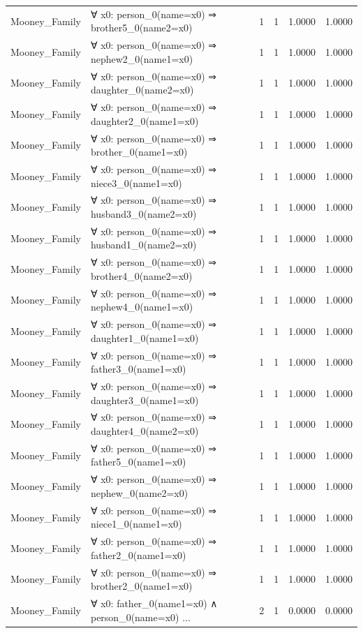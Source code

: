 \documentclass[11pt,a4paper]{article}
\begin{document}
\begin{table}[h!]
\begin{longtable}{|l|p{6cm}|c|c|c|c|}
Mooney_Family & ∀ x0: person\_0(name=x0) ⇒ brother5\_0(name2=x0) & 1 & 1 & 1.0000 & 1.0000 \\
Mooney_Family & ∀ x0: person\_0(name=x0) ⇒ nephew2\_0(name1=x0) & 1 & 1 & 1.0000 & 1.0000 \\
Mooney_Family & ∀ x0: person\_0(name=x0) ⇒ daughter\_0(name2=x0) & 1 & 1 & 1.0000 & 1.0000 \\
Mooney_Family & ∀ x0: person\_0(name=x0) ⇒ daughter2\_0(name1=x0) & 1 & 1 & 1.0000 & 1.0000 \\
Mooney_Family & ∀ x0: person\_0(name=x0) ⇒ brother\_0(name1=x0) & 1 & 1 & 1.0000 & 1.0000 \\
Mooney_Family & ∀ x0: person\_0(name=x0) ⇒ niece3\_0(name1=x0) & 1 & 1 & 1.0000 & 1.0000 \\
Mooney_Family & ∀ x0: person\_0(name=x0) ⇒ husband3\_0(name2=x0) & 1 & 1 & 1.0000 & 1.0000 \\
Mooney_Family & ∀ x0: person\_0(name=x0) ⇒ husband1\_0(name2=x0) & 1 & 1 & 1.0000 & 1.0000 \\
Mooney_Family & ∀ x0: person\_0(name=x0) ⇒ brother4\_0(name2=x0) & 1 & 1 & 1.0000 & 1.0000 \\
Mooney_Family & ∀ x0: person\_0(name=x0) ⇒ nephew4\_0(name1=x0) & 1 & 1 & 1.0000 & 1.0000 \\
Mooney_Family & ∀ x0: person\_0(name=x0) ⇒ daughter1\_0(name1=x0) & 1 & 1 & 1.0000 & 1.0000 \\
Mooney_Family & ∀ x0: person\_0(name=x0) ⇒ father3\_0(name1=x0) & 1 & 1 & 1.0000 & 1.0000 \\
Mooney_Family & ∀ x0: person\_0(name=x0) ⇒ daughter3\_0(name1=x0) & 1 & 1 & 1.0000 & 1.0000 \\
Mooney_Family & ∀ x0: person\_0(name=x0) ⇒ daughter4\_0(name2=x0) & 1 & 1 & 1.0000 & 1.0000 \\
Mooney_Family & ∀ x0: person\_0(name=x0) ⇒ father5\_0(name1=x0) & 1 & 1 & 1.0000 & 1.0000 \\
Mooney_Family & ∀ x0: person\_0(name=x0) ⇒ nephew\_0(name2=x0) & 1 & 1 & 1.0000 & 1.0000 \\
Mooney_Family & ∀ x0: person\_0(name=x0) ⇒ niece1\_0(name1=x0) & 1 & 1 & 1.0000 & 1.0000 \\
Mooney_Family & ∀ x0: person\_0(name=x0) ⇒ father2\_0(name1=x0) & 1 & 1 & 1.0000 & 1.0000 \\
Mooney_Family & ∀ x0: person\_0(name=x0) ⇒ brother2\_0(name1=x0) & 1 & 1 & 1.0000 & 1.0000 \\
Mooney_Family & ∀ x0: father\_0(name1=x0) ∧ person\_0(name=x0) ... & 2 & 1 & 0.0000 & 0.0000 \\

\end{longtable}
\end{table}
\end{document}
